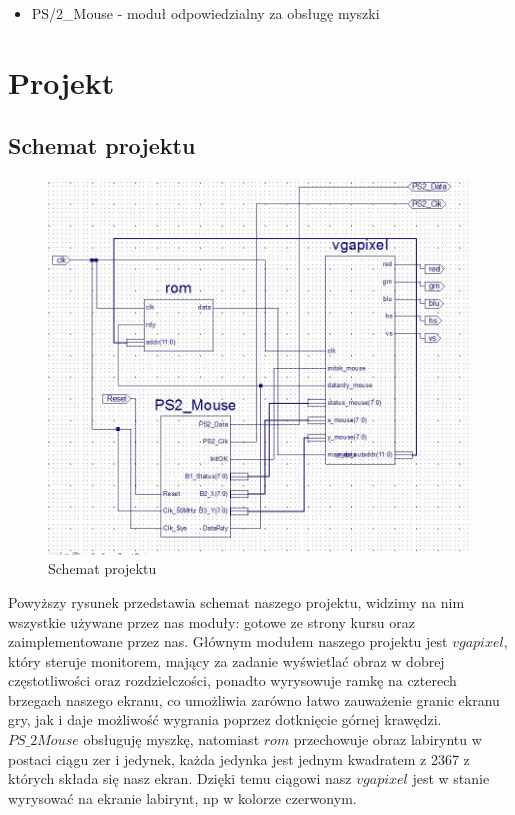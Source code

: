 \documentclass[a4paper]{article}
\begin{document}
\begin{itemize}

  \item PS/2\_Mouse - moduł odpowiedzialny za obsługę myszki

\end{itemize}




\section{Projekt}
\subsection{Schemat projektu}


\begin{figure}[h]
  \caption{Schemat projektu}
  \includegraphics[scale=0.65]{schemat}
  \centering
\end{figure}

Powyższy rysunek przedstawia schemat naszego projektu, widzimy na nim wszystkie używane przez nas moduły: gotowe ze strony kursu oraz zaimplementowane przez nas. Głównym modułem naszego projektu jest $vgapixel$, który steruje monitorem, mający za zadanie wyświetlać obraz w dobrej częstotliwości oraz rozdzielczości, ponadto wyrysowuje ramkę na czterech brzegach naszego ekranu, co umożliwia zarówno łatwo zauważenie granic ekranu gry, jak i daje możliwość wygrania poprzez dotknięcie górnej krawędzi. $PS\_2Mouse$ obsługuję myszkę, natomiast $rom$ przechowuje obraz labiryntu w postaci ciągu zer i jedynek, każda jedynka jest jednym kwadratem z 2367 z których składa się nasz ekran. Dzięki temu ciągowi nasz $vgapixel$ jest w stanie wyrysować na ekranie labirynt, np w kolorze czerwonym. 
\end{document}
